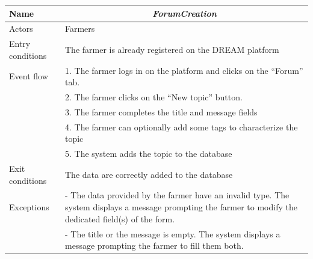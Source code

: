 \begin{table}[htbp]
	\centering
	\begin{tabularx}{\linewidth}{|l|X|}
		\hline
		Name & \multicolumn{1}{c|}{\textit{\textbf{ForumCreation}}}                                                   \tabularnewline \hline
		Actors                                               & Farmers                                                    \tabularnewline \hline
		Entry conditions                                              &
		The farmer is already registered on the DREAM platform
		\tabularnewline
		Event flow                                         & 1.	The farmer logs in on the platform and clicks on the “Forum” tab.                                           \tabularnewline 
		& 2.	The farmer clicks on the “New topic” button.                                            \tabularnewline 
		& 3.	The farmer completes the title and message fields                                            \tabularnewline 
		& 4.	The farmer can optionally add some tags to characterize the topic                                    
		\tabularnewline 
		&
		5.	The system adds the topic to the database
		\tabularnewline \hline
		Exit conditions 
		&  The data are correctly added to the database
		\tabularnewline \hline
		Exceptions 
		& 
		-	The data provided by the farmer have an invalid type. The system displays a message prompting the farmer to modify the dedicated field(s) of the form.
		\tabularnewline
		&-	The title or the message is empty. The system displays a message prompting the farmer to fill them both.
		\tabularnewline
		\hline
	\end{tabularx}   
\end{table}

